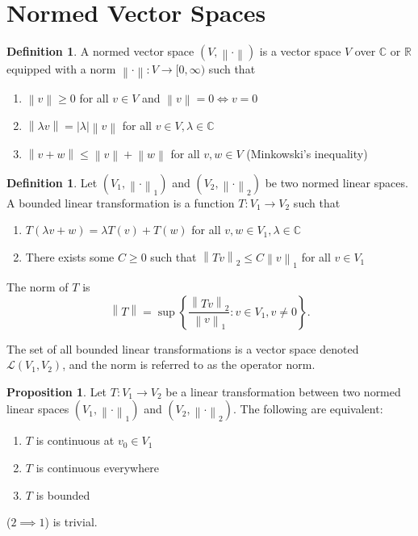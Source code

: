 \documentclass[11pt]{article}
\theoremstyle{definition}
\newtheorem{defn}[thm]{Definition}
\newtheorem{prop}[thm]{Proposition}
\newcommand{\set}[1]{\left\{ #1 \right\}}
\newcommand{\abs}[1]{\left\lvert#1\right\rvert} %
\newcommand{\RR}{\mathbb{R}}
\newcommand{\CC}{\mathbb{C}}
\newcommand{\m}[1]{\mathcal{#1}}
\newcommand{\norm}[1]{\left\lVert#1\right\rVert} %
\begin{document}

\section{Normed Vector Spaces}

\begin{defn}
A normed vector space $(V,\norm{\cdot})$ is a vector space $V$ over $\CC$ or $\RR$ equipped
with a norm $\norm\cdot:V\to[0,\infty)$ such that
\begin{enumerate}
\item $\norm v\ge0$ for all $v\in V$ and $\norm v=0 \iff v=0$
\item $\norm{\lambda v} = \abs\lambda\norm v$ for all $v\in V, \lambda\in\CC$
\item $\norm{v+w}\le\norm{v}+\norm{w}$ for all $v,w\in V$ (Minkowski's inequality)
\end{enumerate}
\end{defn}

\begin{defn}
Let $(V_1,\norm\cdot_1)$ and $(V_2,\norm\cdot_2)$ be two normed linear spaces. A bounded
linear transformation is a function $T:V_1\to V_2$ such that
\begin{enumerate}
\item $T(\lambda v+w) = \lambda T(v)+T(w)$ for all $v,w\in V_1,\lambda\in\CC$
\item There exists some $C\ge0$ such that $\norm{Tv}_2\le C\norm{v}_1$ for all $v\in V_1$
\end{enumerate}
The norm of $T$ is
\[
\norm{T} = \sup\set{\frac{\norm{Tv}_2}{\norm{v}_1} : v\in V_1, v\neq0} .
\]
\end{defn}

The set of all bounded linear transformations is a vector space denoted $\m{L}(V_1,V_2)$,
and the norm is referred to as the operator norm.

\begin{prop}
Let $T:V_1\to V_2$ be a linear transformation between two normed linear spaces
$(V_1,\norm\cdot_1)$ and $(V_2,\norm\cdot_2)$. The following are equivalent:
\begin{enumerate}
\item $T$ is continuous at $v_0\in V_1$
\item $T$ is continuous everywhere
\item $T$ is bounded
\end{enumerate}
\end{prop}
\proof
($2\implies1$) is trivial.
\end{document}
